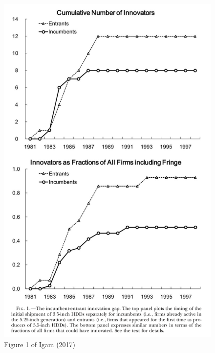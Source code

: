 \documentclass[]{book}
\theoremstyle{definition}
\theoremstyle{definition}
\theoremstyle{definition}
\theoremstyle{remark}
\begin{document}
\begin{figure}

{\centering \includegraphics[width=0.8\linewidth]{figuretable/Igam2017Fig1} 

}

\caption{Figure 1 of Igam (2017)}\label{fig:unnamed-chunk-2}
\end{figure}
\end{document}
